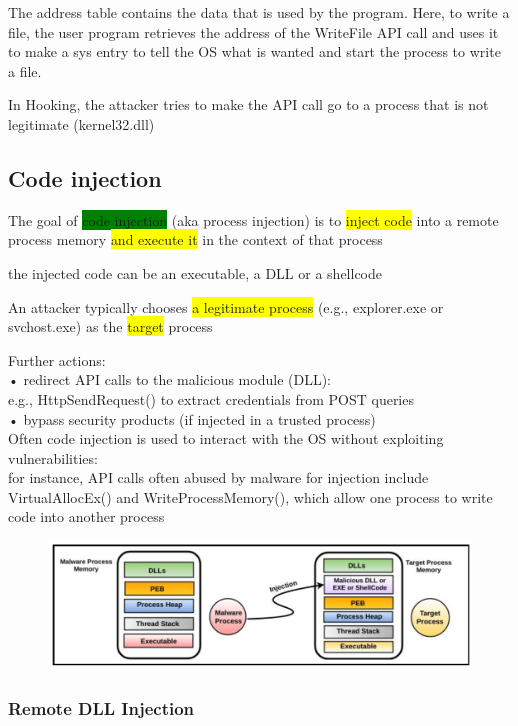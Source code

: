 \documentclass[]{project_plan}
\begin{document}
The address table contains the data that is used by the program. Here, to write
a file, the user program retrieves the address of the WriteFile API call and
uses it to make a sys entry to tell the OS what is wanted and start the process
to write a file.

In Hooking, the attacker tries to make the API call go to a process that
is not legitimate (kernel32.dll)

\subsection{Code injection}

The goal of \colorbox{green}{code injection} (aka process injection) is to \colorbox{yellow}{inject code} into a remote process
memory \colorbox{yellow}{and execute it} in the context of that process

the injected code can be an executable, a DLL or a shellcode

An attacker typically chooses \colorbox{yellow}{a legitimate process} (e.g., explorer.exe or svchost.exe) as
the \colorbox{yellow}{target} process

Further actions:\\
• redirect API calls to the malicious module (DLL):\\
e.g., HttpSendRequest() to extract credentials from POST queries\\
• bypass security products (if injected in a trusted process)\\

Often code injection is used to interact with the OS without exploiting vulnerabilities:\\
for instance, API calls often abused by malware for injection include VirtualAllocEx() and
WriteProcessMemory(), which allow one process to write code into another process

\begin{figure}[H]
  \centering
  \includegraphics[width=\linewidth]{code injection.png}
\end{figure}

\subsubsection{Remote DLL Injection}
\end{document}
